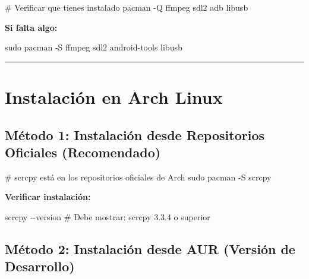 \documentclass[
  doc,
  floatsintext,
  longtable,
  a4paper,
  nolmodern,
  notxfonts,
  notimes,
  12pt,
  colorlinks=true,linkcolor=blue,citecolor=blue,urlcolor=blue]{apa7}
\newenvironment{Shaded}{\begin{snugshade}}{\end{snugshade}}
\newcommand{\AttributeTok}[1]{\textcolor[rgb]{0.40,0.45,0.13}{#1}}
\newcommand{\CommentTok}[1]{\textcolor[rgb]{0.37,0.37,0.37}{#1}}
\newcommand{\ExtensionTok}[1]{\textcolor[rgb]{0.00,0.23,0.31}{#1}}
\newcommand{\FunctionTok}[1]{\textcolor[rgb]{0.28,0.35,0.67}{#1}}
\newcommand{\NormalTok}[1]{\textcolor[rgb]{0.00,0.23,0.31}{#1}}
\begin{document}
\begin{Shaded}
\begin{Highlighting}[]
\CommentTok{\# Verificar que tienes instalado}
\ExtensionTok{pacman} \AttributeTok{{-}Q}\NormalTok{ ffmpeg sdl2 adb libusb}
\end{Highlighting}
\end{Shaded}

\textbf{Si falta algo:}

\begin{Shaded}
\begin{Highlighting}[]
\FunctionTok{sudo}\NormalTok{ pacman }\AttributeTok{{-}S}\NormalTok{ ffmpeg sdl2 android{-}tools libusb}
\end{Highlighting}
\end{Shaded}

\begin{center}\rule{0.5\linewidth}{0.5pt}\end{center}

\section{Instalación en Arch Linux}\label{instalaciuxf3n-en-arch-linux}

\subsection{Método 1: Instalación desde Repositorios Oficiales
(Recomendado)}\label{muxe9todo-1-instalaciuxf3n-desde-repositorios-oficiales-recomendado}

\begin{Shaded}
\begin{Highlighting}[]
\CommentTok{\# scrcpy está en los repositorios oficiales de Arch}
\FunctionTok{sudo}\NormalTok{ pacman }\AttributeTok{{-}S}\NormalTok{ scrcpy}
\end{Highlighting}
\end{Shaded}

\textbf{Verificar instalación:}

\begin{Shaded}
\begin{Highlighting}[]
\ExtensionTok{scrcpy} \AttributeTok{{-}{-}version}
\CommentTok{\# Debe mostrar: scrcpy 3.3.4 o superior}
\end{Highlighting}
\end{Shaded}

\subsection{Método 2: Instalación desde AUR (Versión de
Desarrollo)}\label{muxe9todo-2-instalaciuxf3n-desde-aur-versiuxf3n-de-desarrollo}
\end{document}
